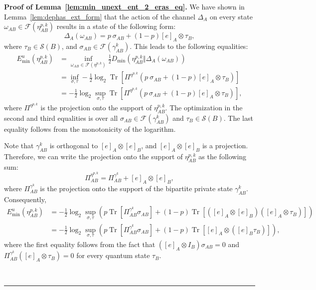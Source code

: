 \documentclass[twocolumn,letterpaper, dvipsnames,allowtoday, accepted = 2025-12-31]{quantumarticle}
\newenvironment{proof}[1][Proof]{\noindent\textbf{#1.} }{\ \rule{0.5em}{0.5em}}
\begin{document}
\begin{proof}[Proof of Lemma~\ref{lem:min_unext_ent_2_eras_eq}]
We have shown in Lemma~\ref{lem:dephas_ext_form} that the action of the channel $\Delta_A$ on every state $\omega_{AB}\in \mathcal{F}\!\left(\eta^{p,k}_{AB}\right)$ results in a state of the following form:
\begin{equation}
    \Delta_A\!\left(\omega_{AB}\right) = p~\sigma_{AB} + (1-p)[e]_A\otimes\tau_B,
\end{equation}
where $\tau_B \in \mathcal{S}\!\left(B\right)$, and $\sigma_{AB} \in \mathcal{F}\!\left(\gamma^k_{AB}\right)$. This leads to the following equalities:
\begin{align}
    E^u_{\min}\!\left(\eta^{p,k}_{AB}\right)
    &=  \inf_{\omega_{AB} \in \mathcal{F}\left(\eta^{p,k}\right)}\frac{1}{2}D_{\min}\!\left(\eta^{p,k}_{AB}\Big\Vert\Delta_A\!\left(\omega_{AB}\right)\right)\\
    &=  \inf_{\sigma, \tau}- \frac{1}{2}\log_2 \operatorname{Tr}\!\left[\Pi^{\eta^{p,k}}\left(p~\sigma_{AB} + (1-p)[e]_{A}\otimes \tau_{B}\right)\right]\\
    &=  - \frac{1}{2}\log_2 \sup_{\sigma, \tau}\operatorname{Tr}\!\left[\Pi^{\eta^{p,k}}\left(p~\sigma_{AB} + (1-p)[e]_{A}\otimes \tau_{B}\right)\right],
\end{align}
where $\Pi^{\eta^{p,k}}$ is the projection onto the support of $\eta^{p,k}_{AB}$. The optimization in the second and third equalities is over all $\sigma_{AB} \in \mathcal{F}\!\left(\gamma^k_{AB}\right)$ and $\tau_{B}\in \mathcal{S}\!\left(B\right)$. The last equality follows from the monotonicity of the logarithm. 

Note that $\gamma^k_{AB}$ is orthogonal to $[e]_{A}\otimes[e]_{B}$, and $[e]_{A}\otimes[e]_{B}$ is a projection. Therefore, we can write the projection onto the support of $\eta^{p,k}_{AB}$ as the following sum:
\begin{equation}
    \Pi^{\eta^{p,k}}_{AB} = \Pi^{\gamma^{k}}_{AB} + [e]_{A}\otimes[e]_{B},
\end{equation}
where $\Pi^{\gamma^{k}}_{AB}$ is the projection onto the support of the bipartite private state $\gamma^k_{AB}$. Consequently,
\begin{align}
    E^u_{\min}\!\left(\eta^{p,k}_{AB}\right)
    &= -\frac{1}{2}\log_2 \sup_{\sigma,\tau} \left(p\operatorname{Tr}\!\left[\Pi^{\gamma^k}_{AB}\sigma_{AB}\right] 
    + (1-p)\operatorname{Tr}\!\left[\left([e]_{A}\otimes[e]_{B}\right)\left([e]_{A}\otimes\tau_{B}\right)\right]\right)\\
    &= -\frac{1}{2}\log_2 \sup_{\sigma,\tau} \left(p\operatorname{Tr}\!\left[\Pi^{\gamma^k}_{AB}\sigma_{AB}\right]+ (1-p)\operatorname{Tr}\!\left[[e]_{A}\otimes\left([e]_{B}\tau_{B}\right)\right]\right),\label{eq:min_unext_ent_double_eras_priv_expansion}
\end{align}
where the first equality follows from the fact that $\left([e]_A\otimes I_B\right)\sigma_{AB} = 0$ and $\Pi^{\gamma^k}_{AB}\left([e]_{A}\otimes\tau_{B}\right) = 0$ for every quantum state $\tau_{B}$. 


\end{proof}
\end{document}
